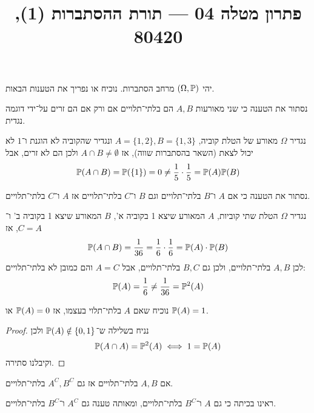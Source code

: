 
\title{פתרון מטלה 04 --- תורת ההסתברות (1), 80420}


\maketitle
\maketitleprint{}

\Question{}
יהי $(\Omega, \mathbb{P})$ מרחב הסתברות.
נוכיח או נפריך את הטענות הבאות.

\Subquestion{}
נסתור את הטענה כי שני מאורעות $A, B$ הם בלתי־תלויים אם ורק אם הם זרים על־ידי דוגמה נגדית.
\begin{solution}
	נגדיר $\Omega$ מאורע של הטלת קוביה, $A = \{ 1, 2 \}, B = \{ 1, 3 \}$ ונגדיר שהקוביה לא הוגנת ו־$1$ לא יכול לצאת (השאר בהסתברות שווה), אז $A \cap B \ne \emptyset$ ולכן הם לא זרים, אבל
	\[
		\mathbb{P}(A \cap B) = \mathbb{P}(\{ 1 \}) = 0 \ne \frac{1}{5} \cdot \frac{1}{5} = \mathbb{P}(A) \mathbb{P}(B)
	\]
\end{solution}

\Subquestion{}
נסתור את הטענה כי אם $A$ ו־$B$ בלתי־תלויים וגם $B$ ו־$C$ בלתי־תלויים אז $A$ ו־$C$ בלתי־תלויים.
\begin{solution}
	נגדיר $\Omega$ הטלת שתי קוביות, $A$ המאורע שיצא 1 בקוביה א', $B$ המאורע שיצא 1 בקוביה ב' ו־$C = A$, אז
	\[
		\mathbb{P}(A \cap B) = \frac{1}{36} = \frac{1}{6} \cdot \frac{1}{6} = \mathbb{P}(A) \cdot \mathbb{P}(B)
	\]
	לכן $A, B$ בלתי־תלויים, ולכן גם $B, C$ בלתי־תלויים, אבל $A = C$ והם כמובן לא בלתי־תלויים:
	\[
		\mathbb{P}(A) = \frac{1}{6} \ne \frac{1}{36} = \mathbb{P}^2(A)
	\]
\end{solution}

\Subquestion{}
נוכיח שאם $A$ בלתי־תלוי בעצמו, אז $\mathbb{P}(A) = 0$ או $\mathbb{P}(A) = 1$.
\begin{proof}
	נניח בשלילה ש־$\mathbb{P}(A) \notin \{0, 1\}$ ולכן
	\[
		\mathbb{P}(A \cap A) = \mathbb{P}^2(A)
		\iff
		1 = \mathbb{P}(A)
	\]
	וקיבלנו סתירה.
\end{proof}

\Subquestion{}
אם $A, B$ בלתי־תלויים אז גם $A^C, B^C$ בלתי־תלויים.
\begin{solution}
	ראינו בכיתה כי גם $A$ ו־$B^C$ בלתי־תלויים, ומאותה טענה גם $A^C$ ו־$B^C$ בלתי־תלויים.
\end{solution}


